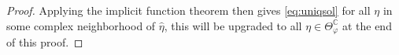 \documentclass[
	fontsize=11pt, 
	twoside=false, 
	abstract=true, 
	a4paper,
]{scrartcl}
\newcommand{\RR}{\mathbb{R}}
\newcommand{\CC}{\mathbb{C}}
\newcommand{\norm}[1]{\left\lVert#1\right\rVert}
\newcommand{\id}{\mathrm{id}}
\begin{document}
\begin{proof}
	Applying the implicit function theorem then gives \cref{eq:uniqsol} for all $\eta$ in some complex neighborhood of $\hat\eta$, this will be upgraded to all $\eta\in\Theta^\CC_\varphi$ at the end of this proof.
%
%	


\end{proof}
\end{document}
